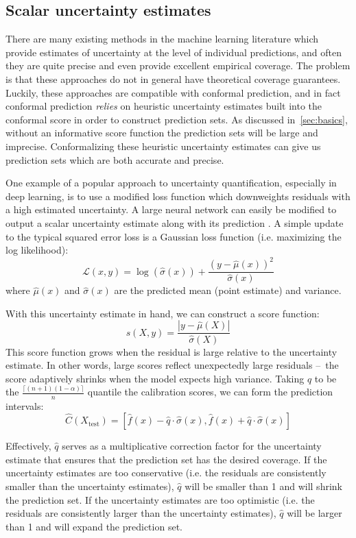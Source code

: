 \documentclass[a4paper, 12pt]{article}
\begin{document}
\subsection{Scalar uncertainty estimates}
\label{sec:scalar}
There are many existing methods in the machine learning literature which provide estimates of uncertainty at the level of individual predictions, and often they are quite precise and even provide excellent empirical coverage. The problem is that these approaches do not in general have theoretical coverage guarantees. Luckily, these approaches are compatible with conformal prediction, and in fact conformal prediction \textit{relies} on heuristic uncertainty estimates built into the conformal score in order to construct prediction sets. As discussed in~\ref*{sec:basics}, without an informative score function the prediction sets will be large and imprecise. Conformalizing these heuristic uncertainty estimates can give us prediction sets which are both accurate and precise.

One example of a popular approach to uncertainty quantification, especially in deep learning, is to use a modified loss function which downweights residuals with a high estimated uncertainty. A large neural network can easily be modified to output a scalar uncertainty estimate along with its prediction \autocite{nixEstimatingMeanVariance1994,lakshminarayananSimpleScalablePredictive2017,angelopoulosImagetoImageRegressionDistributionFree2022}. A simple update to the typical squared error loss is a Gaussian loss function (i.e. maximizing the log likelihood): \[\mathcal{L}(x, y) = \log(\hat{\sigma}(x)) + \frac{(y-\hat{\mu}(x))^2}{\hat{\sigma}(x)}\]
where $\hat{\mu}(x)$ and $\hat{\sigma}(x)$ are the predicted mean (point estimate) and variance.

With this uncertainty estimate in hand, we can construct a score function:
\[ s(X, y) = \frac{|y-\hat{\mu}(X)|}{\hat{\sigma}(X)} \]
This score function grows when the residual is large relative to the uncertainty estimate. In other words, large scores reflect unexpectedly large residuals --\ the score adaptively shrinks when the model expects high variance. Taking $\hat{q}$ to be the $\frac{\lceil (n+1)(1-\alpha) \rceil }{n}$ quantile the calibration scores, we can form the prediction intervals:
\[ \hat{C}(X_{\text{test}}) = \left[ \hat{f}(x) - \hat{q} \cdot \hat{\sigma}(x), \hat{f}(x) + \hat{q} \cdot \hat{\sigma}(x) \right] \]

Effectively, $\hat{q}$ serves as a multiplicative correction factor for the uncertainty estimate that ensures that the prediction set has the desired coverage. If the uncertainty estimates are too conservative (i.e. the residuals are consistently smaller than the uncertainty estimates), $\hat{q}$ will be smaller than 1 and will shrink the prediction set. If the uncertainty estimates are too optimistic (i.e. the residuals are consistently larger than the uncertainty estimates), $\hat{q}$ will be larger than 1 and will expand the prediction set.
\end{document}
